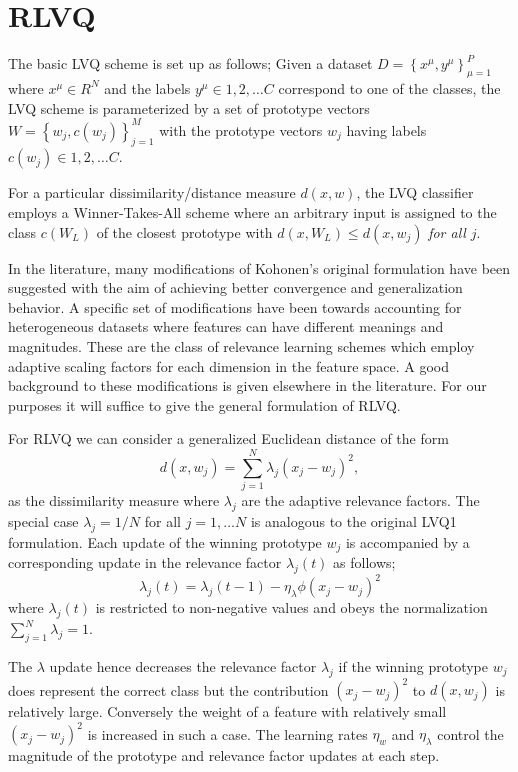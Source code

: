 \documentclass{esannV2}
\begin{document}
\section{RLVQ}
\label{sec:RLVQ}

The basic LVQ scheme is set up as follows; Given a dataset $D = \left\{x^\mu, y^\mu\right\}^P_{\mu = 1}$ where $x^\mu \in R^N$ and the labels $y^\mu \in {1,2,\ldots C}$ correspond to one of the classes, the LVQ scheme is parameterized by a set of prototype vectors $W = \left\{w_j, c(w_j)\right\}^M_{j=1}$ with the prototype vectors $w_j$ having labels $c(w_j) \in {1,2,\dots C}$.

For a particular dissimilarity/distance measure $d(x,w)$, the LVQ classifier employs a Winner-Takes-All scheme where an arbitrary input is assigned to the class $c(W_L)$ of the closest prototype with $d(x,W_L) \leq d(x,w_j)$ \textsl{for all} $j$.

In the literature, many modifications of Kohonen's original formulation\cite{02} have been suggested with the aim of achieving better convergence and generalization behavior. A specific set of modifications have been towards accounting for heterogeneous datasets where features can have different meanings and magnitudes. These are the class of relevance learning schemes which employ adaptive scaling factors for each dimension in the feature space. A good background to these modifications is given elsewhere in the literature\cite{09,10,11}. For our purposes it will suffice to give the general formulation of RLVQ.

For RLVQ we can consider a generalized Euclidean distance of the form
%
\begin{equation} 
d(x,w_j) = \sum^N_{j=1} \lambda_j (x_j - w_j)^2 ,
\end{equation}
%
\noindent
as the dissimilarity measure where $\lambda_j$ are the adaptive relevance factors. The special case $\lambda_j = 1/N$ for all $j = 1,\ldots N$ is analogous to the original LVQ1 formulation. Each update of the winning prototype $w_j$ is accompanied by a corresponding update in the relevance factor $\lambda_j(t)$ as follows;
%
\begin{equation}
\lambda_j(t) = \lambda_j(t-1) - \eta_\lambda \phi (x_j - w_j)^2 
\end{equation}
%
\noindent
where $\lambda_j(t)$ is restricted to non-negative values and obeys the normalization $\sum^N_{j=1} \lambda_j = 1$.

The $\lambda$ update hence decreases the relevance factor $\lambda_j$ if the winning prototype $w_j$ does represent the correct class but the contribution $(x_j - w_j)^2$ to $d(x,w_j)$ is relatively large. Conversely the weight of a feature with relatively small $(x_j - w_j)^2$ is increased in such a case. The learning rates $\eta_w$ and $\eta_\lambda$ control the magnitude of the prototype and relevance factor updates at each step.
\end{document}
